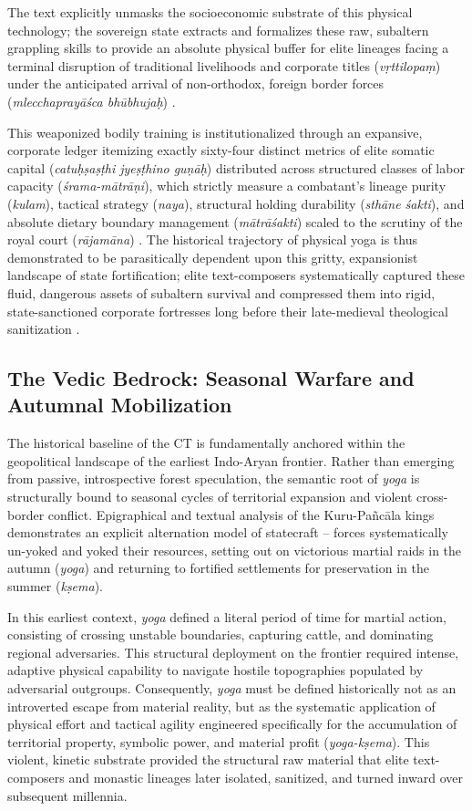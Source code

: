 \documentclass[11pt,twoside,letterpaper]{article}
\begin{document}
The text explicitly unmasks the socioeconomic substrate of this physical technology; the sovereign state extracts and formalizes these raw, subaltern grappling skills to provide an absolute physical buffer for elite lineages facing a terminal disruption of traditional livelihoods and corporate titles (\textit{vṛttilopaṃ}) under the anticipated arrival of non-orthodox, foreign border forces (\textit{mlecchaprayāśca bhūbhujaḥ}) \citep{MP_7}. 

This weaponized bodily training is institutionalized through an expansive, corporate ledger itemizing exactly sixty-four distinct metrics of elite somatic capital (\textit{catuḥṣaṣṭhi jyeṣṭhino guṇāḥ}) distributed across structured classes of labor capacity (\textit{śrama-mātrāṇi}), which strictly measure a combatant's lineage purity (\textit{kulam}), tactical strategy (\textit{naya}), structural holding durability (\textit{sthāne śakti}), and absolute dietary boundary management (\textit{mātrāśakti}) scaled to the scrutiny of the royal court (\textit{rājamāna}) \citep{MP_7, Olivelle2011}. The historical trajectory of physical yoga is thus demonstrated to be parasitically dependent upon this gritty, expansionist landscape of state fortification; elite text-composers systematically captured these fluid, dangerous assets of subaltern survival and compressed them into rigid, state-sanctioned corporate fortresses long before their late-medieval theological sanitization \citep{MP_7, Wujastyk2025}.


\subsection{The Vedic Bedrock: Seasonal Warfare and Autumnal Mobilization}
The historical baseline of the CT is fundamentally anchored within the geopolitical landscape of the earliest Indo-Aryan frontier. Rather than emerging from passive, introspective forest speculation, the semantic root of \textit{yoga} is structurally bound to seasonal cycles of territorial expansion and violent cross-border conflict. Epigraphical and textual analysis of the Kuru-Pañcāla kings demonstrates an explicit alternation model of statecraft -- forces systematically un-yoked and yoked their resources, setting out on victorious martial raids in the autumn (\textit{yoga}) and returning to fortified settlements for preservation in the summer (\textit{kṣema}).

In this earliest context, \textit{yoga} defined a literal period of time for martial action, consisting of crossing unstable boundaries, capturing cattle, and dominating regional adversaries. This structural deployment on the frontier required intense, adaptive physical capability to navigate hostile topographies populated by adversarial outgroups. Consequently, \textit{yoga} must be defined historically not as an introverted escape from material reality, but as the systematic application of physical effort and tactical agility engineered specifically for the accumulation of territorial property, symbolic power, and material profit (\textit{yoga-kṣema}). This violent, kinetic substrate provided the structural raw material that elite text-composers and monastic lineages later isolated, sanitized, and turned inward over subsequent millennia.
\end{document}
